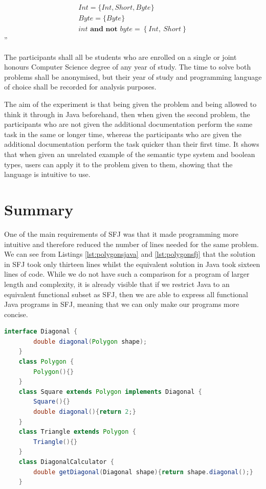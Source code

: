 \documentclass{l4proj}
\begin{document}
\begin{equation*}
    \begin{array}{l}
        Int = \{Int, Short, Byte\}
        \\
        Byte = \{Byte\}
        \\
        int \textbf{ and not } byte = \left\{Int,\ Short\right\}
    \end{array}
\end{equation*}
''

The participants shall all be students who are enrolled on a single or joint honours Computer Science degree of any year of study.
The time to solve both problems shall be anonymised, but their year of study and programming language of choice shall be recorded for analysis purposes.

The aim of the experiment is that being given the problem and being allowed to think it through in Java beforehand, then when given the second problem, the participants who are not given the additional documentation perform the same task in the same or longer time, whereas the participants who are given the additional documentation perform the task quicker than their first time.
It shows that when given an unrelated example of the semantic type system and boolean types, users can apply it to the problem given to them, showing that the language is intuitive to use.

\section{Summary}

One of the main requirements of SFJ was that it made programming more intuitive and therefore reduced the number of lines needed for the same problem.
We can see from Listings \ref{lst:polygonsjava} and \ref{lst:polygonsfj} that the solution in SFJ took only thirteen lines whilst the equivalent solution in Java took sixteen lines of code.
While we do not have such a comparison for a program of larger length and complexity, it is already visible that if we restrict Java to an equivalent functional subset as SFJ, then we are able to express all functional Java programs in SFJ, meaning that we can only make our programs more concise.

\begin{lstlisting}[language=Java, caption={Polygons example solution in Java}, label=lst:polygonsjava]
    interface Diagonal {
        double diagonal(Polygon shape);
    }
    class Polygon {
        Polygon(){}
    }
    class Square extends Polygon implements Diagonal {
        Square(){}
        double diagonal(){return 2;}
    }
    class Triangle extends Polygon {
        Triangle(){}
    }
    class DiagonalCalculator {
        double getDiagonal(Diagonal shape){return shape.diagonal();}
    }
\end{lstlisting}
\end{document}
